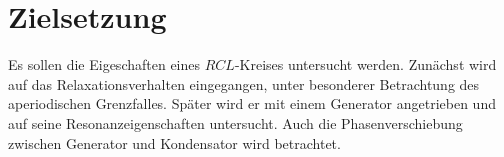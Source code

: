 \section{Zielsetzung}
\label{sec:Zielsetzung}
Es sollen die Eigeschaften eines $RCL$-Kreises untersucht werden. Zunächst wird
auf das Relaxationsverhalten eingegangen, unter besonderer Betrachtung des aperiodischen Grenzfalles.
 Später wird er mit einem Generator angetrieben und auf seine Resonanzeigenschaften untersucht.
  Auch die Phasenverschiebung zwischen Generator und Kondensator wird betrachtet.  

